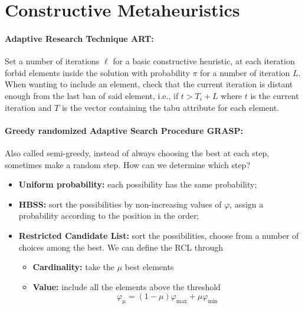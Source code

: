 \documentclass{article}
\begin{document}
	\section*{Constructive Metaheuristics}
	
	\paragraph{Adaptive Research Technique ART:} Set a number of iterations $\ell$ for a basic constructive heuristic, at each iteration forbid elements inside the solution with probability $\pi$ for a number of iteration $L$. When wanting to include an element, check that the current iteration is distant enough from the last ban of said element, i.e., if $t > T_i + L$ where $t$ is the current iteration and $T$ is the vector containing the tabu attribute for each element.\\
	
	\paragraph{Greedy randomized Adaptive Search Procedure GRASP:} Also called semi-greedy, instead of always choosing the best at each step, sometimes make a random step. How can we determine which step? 
	\begin{itemize}
		\item \textbf{Uniform probability:} each possibility has the same probability;
		\item \textbf{HBSS:} sort the possibilities by non-increasing values of $\varphi$, assign a probability according to the position in the order;
		\item \textbf{Restricted Candidate List:} sort the possibilities, choose from a number of choices among the best. We can define the RCL through 
		\begin{itemize}
			\item \textbf{Cardinality:} take the $\mu$ best elements
			\item \textbf{Value:} include all the elements above the threshold
			$$ \varphi_\mu = (1-\mu)\varphi_{\max} + \mu \varphi_{\min} $$
		\end{itemize}
	\end{itemize}
	
\end{document}
